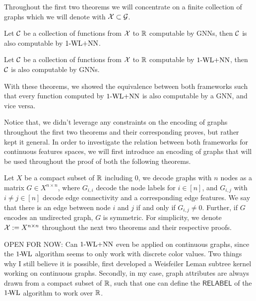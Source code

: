 Throughout the first two theorems we will concentrate on a finite collection of graphs which we will denote with $\mathcal{X} \subset \mathcal{G}$.

\begin{theorem}\label{theorem:1wl_in_gnn}
    Let $\mathcal{C}$ be a collection of functions from $\mathcal{X}$ to $\mathbb{R}$ computable by GNNs, then $\mathcal{C}$ is also computable by $\text{1-WL+NN}$.
\end{theorem}

\begin{theorem}\label{theorem:gnn_in_1wl}
    Let $\mathcal{C}$ be a collection of functions from $\mathcal{X}$ to $\mathbb{R}$ computable by $\text{1-WL+NN}$, then $\mathcal{C}$ is also computable by GNNs.
\end{theorem}
With these theorems, we showed the equivalence between both frameworks such that every function computed by $\text{1-WL+NN}$ is also computable by a GNN, and vice versa.

Notice that, we didn't leverage any constraints on the encoding of graphs throughout the first two theorems and their corresponding proves, but rather kept it general. In order to investigate the relation between both frameworks for continuous features spaces, we will first introduce an encoding of graphs that will be used throughout the proof of both the following theorems.

\begin{definition}
    Let $X$ be a compact subset of $\mathbb{R}$ including $0$, we decode graphs with $n$ nodes as a matrix $G \in X^{n \times n}$, where $G_{i,i}$ decode the node labels for $i \in [n]$, and $G_{i,j}$ with $i \neq j \in [n]$ decode edge connectivity and a corresponding edge features. We say that there is an edge between node $i$ and $j$ if and only if $G_{i,j} \neq 0$. Further, if $G$ encodes an undirected graph, $G$ is symmetric. For simplicity, we denote $\mathcal{X} := X^{n \times n}$ throughout the next two theorems and their respective proofs.
\end{definition}

OPEN FOR NOW: Can $\text{1-WL+NN}$ even be applied on continuous graphs, since the $\text{1-\!WL}$ algorithm seems to only work with discrete color values. Two things why I still believe it is possible, first \cite{Mor+2016} developed a Weisfeiler Leman subtree kernel working on continuous graphs. Secondly, in my case, graph attributes are always drawn from a compact subset of $\mathbb{R}$, such that one can define the $\textsf{RELABEL}$ of the $\text{1-\!WL}$ algorithm to work over $\mathbb{R}$.\todo{!}


